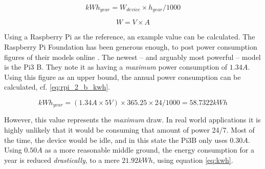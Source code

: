 			\begin{equation}
				kWh_{year} = W_{device} \times h_{year} / 1000
				\label{eq:kwh}
			\end{equation}

			\begin{equation}
				W = V \times A
				\label{eq:w}
			\end{equation}

			Using a Raspberry Pi as the reference, an example value can be calculated. The Raspberry Pi Foundation has been generous enough, to post power consumption figures of their models online \cite{raspberrypi_power}. The newest -- and arguably most powerful -- model is the Pi3 B. They note it as having a \emph{maximum} power consumption of $1.34A$. Using this figure as an upper bound, the annual power consumption can be calculated, cf. \ref{eq:rpi_2_b_kwh}.




			\begin{equation}
				kWh_{year} = (1.34A \times 5V ) \times 365.25 \times 24 / 1000 = 58.7322kWh
				\label{eq:rpi_2_b_kwh}
			\end{equation}

			


			However, this value represents the \emph{maximum} draw. In real world applications it is highly unlikely that it would be consuming that amount of power 24/7. Most of the time, the device would be idle, and in this state the Pi3B only uses $0.30A$. Using $0.50A$ as a more reasonable middle ground, the energy consumption for a year is reduced \emph{drastically}, to a mere $21.92kWh$, using equation \ref{eq:kwh}. 

